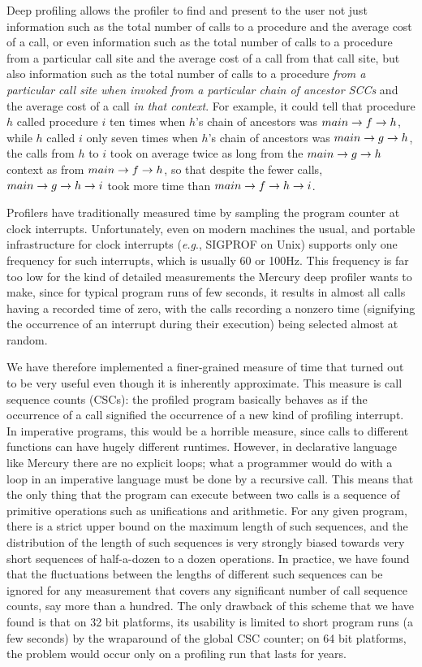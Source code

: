 Deep profiling allows the profiler to find and present to the user
not just information such as the total number of calls to a procedure
and the average cost of a call,
or even information such as the total number of calls to a procedure
from a particular call site and the average cost of a call from that call site,
but also information such as the total number of calls to a procedure
\emph{from a particular call site
when invoked from a particular chain of ancestor SCCs}
and the average cost of a call \emph{in that context}.
For example, it could tell that
procedure $h$ called procedure $i$ ten times
when $h$'s chain of ancestors was $main \rightarrow f \rightarrow h$,
while $h$ called $i$ only seven times
when $h$'s chain of ancestors was $main \rightarrow g \rightarrow h$,
the calls from $h$ to $i$ took on average twice as long
from the $main \rightarrow g \rightarrow h$ context as from $main \rightarrow f \rightarrow h$,
so that despite the fewer calls,
$main \rightarrow g \rightarrow h \rightarrow i$ took more time than $main \rightarrow f \rightarrow h \rightarrow i$.

Profilers have traditionally measured time
by sampling the program counter at clock interrupts.
Unfortunately, even on modern machines
the usual, and portable infrastructure for clock interrupts
(\emph{e.g}., SIGPROF on Unix)
supports only one frequency for such interrupts,
which is usually 60 or 100Hz.
This frequency is far too low for the kind of detailed measurements
the Mercury deep profiler wants to make,
since for typical program runs of few seconds,
it results in almost all calls having a recorded time of zero,
with the calls recording a nonzero time
(signifying the occurrence of an interrupt during their execution)
being selected almost at random.

We have therefore implemented a finer-grained measure of time
that turned out to be very useful
even though it is inherently approximate.
This measure is call sequence counts (CSCs):
the profiled program basically behaves
as if the occurrence of a call signified
the occurrence of a new kind of profiling interrupt.
In imperative programs, this would be a horrible measure,
since calls to different functions can have hugely different runtimes.
However, in declarative language like Mercury there are no explicit loops;
what a programmer would do with a loop in an imperative language
must be done by a recursive call.
This means that the only thing that the program can execute between two calls
is a sequence of primitive operations such as unifications and arithmetic.
For any given program,
there is a strict upper bound on the maximum length of such sequences,
and the distribution of the length of such sequences
is very strongly biased towards very short sequences
of half-a-dozen to a dozen operations.
In practice, we have found that
the fluctuations between the lengths of different such sequences
can be ignored for any measurement
that covers any significant number of call sequence counts,
say more than a hundred.
The only drawback of this scheme that we have found
is that on 32 bit platforms,
its usability is limited to short program runs (a few seconds)
by the wraparound of the global CSC counter;
on 64 bit platforms, the problem would occur
only on a profiling run that lasts for years.

